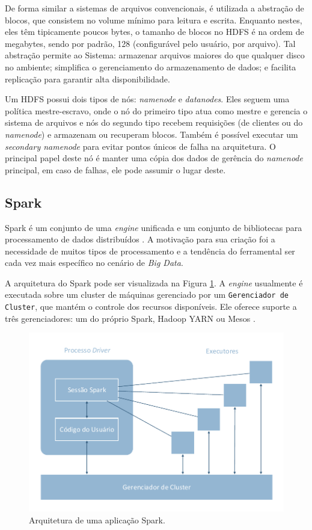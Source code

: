 De forma similar a sistemas de arquivos convencionais, é utilizada a abstração 
de blocos, que consistem no volume mínimo para leitura e escrita. Enquanto 
nestes, eles têm tipicamente poucos bytes, o tamanho de blocos no HDFS 
é na ordem de megabytes, sendo por padrão, 128 (configurável pelo usuário, por 
arquivo). Tal abstração permite ao Sistema: armazenar arquivos maiores do que 
qualquer disco no ambiente; simplifica o gerenciamento do armazenamento de 
dados; e facilita replicação para garantir alta disponibilidade.

Um HDFS possui dois tipos de nós: \textit{namenode} e \textit{datanodes}. Eles 
seguem uma política mestre-escravo, onde o nó do primeiro tipo atua como mestre 
e gerencia o sistema de arquivos e nós do segundo tipo recebem requisições (de 
clientes ou do \textit{namenode}) e armazenam ou recuperam blocos. Também é 
possível executar um \textit{secondary namenode} para evitar pontos únicos de 
falha na arquitetura. O principal papel deste nó é manter uma cópia dos dados de 
gerência do \textit{namenode} principal, em caso de falhas, ele pode assumir o 
lugar deste.

\subsection{Spark} \label{ref:spark}

Spark é um conjunto de uma \textit{engine} unificada e um conjunto de 
bibliotecas para processamento de dados distribuídos \cite{ref:sparkbook}. A 
motivação para sua criação foi a necessidade de muitos tipos de processamento e 
a tendência do ferramental ser cada vez mais específico no cenário de 
\textit{Big Data}.

A arquitetura do Spark pode ser visualizada na Figura \ref{fig:spark-arch}. A 
\textit{engine} usualmente é executada sobre um cluster de máquinas gerenciado 
por um \texttt{Gerenciador de Cluster}, que mantém o controle dos recursos 
disponíveis. Ele oferece suporte a três gerenciadores: um do próprio Spark, 
Hadoop YARN ou Mesos \cite{ref:mesos}.

\begin{figure}[ht]
 \centerline{\includegraphics[width=1\textwidth]{./img/spark-arch.pdf}}
 \caption{Arquitetura de uma aplicação Spark.}
 \label{fig:spark-arch}
\end{figure}


